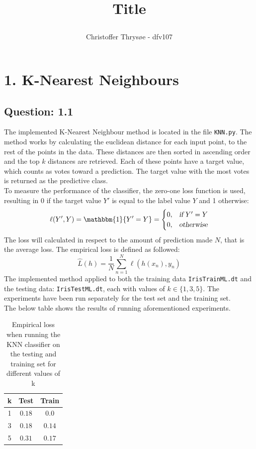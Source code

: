 \documentclass{article}
\title{
\vspace{1in}
\textmd{\textbf{Title}} \\
\author{Christoffer Thrysøe - dfv107}
}
\begin{document}
\maketitle
{}
\section{1. K-Nearest Neighbours}
\subsection{Question: 1.1}
The implemented K-Nearest Neighbour method is located in the file \texttt{KNN.py}. The method works by calculating the euclidean distance for each input point, to the rest of the points in the data. These distances are then sorted in ascending order and the top $k$ distances are retrieved. Each of these points have a target value, which counts as votes toward a prediction. The target value with the most votes is returned as the predictive class.
\\
To measure the performance of the classifier, the zero-one loss function is used, resulting in 0 if the target value $Y'$ is equal to the label value $Y$ and 1 otherwise:
\begin{equation*}
\begin{split}
\ell(Y',Y) =
\mathbbm{1} \lbrace Y'= Y \rbrace =
\begin{cases}
0,& \textsl{if } Y' = Y  \\
0,&  \textsl{otherwise}
\end{cases}
\end{split}
\label{indikator}
\end{equation*}
The loss will calculated in respect to the amount of prediction made $N$, that is the average loss. The empirical loss is defined as followed:
\begin{equation*}
\hat{L}(h) =  \dfrac{1}{N}\sum\limits^{N}_{n=1} \ell (h(x_n),y_n)
\end{equation*}
The implemented method applied to both the training data \texttt{IrisTrainML.dt} and the testing data: \texttt{IrisTestML.dt}, each with values of $k \in \lbrace 1,3,5 \rbrace$.
The experiments have been run separately for the test set and the training set.
\\
The below table shows the results of running aforementioned experiments.
\begin{table}[H]
  \centering
  \label{tab:table1}
  \begin{tabular}{c||c|c}
    \textsf{k} & \textsf{Test} & \textsf{Train} \\
    \hline
    1 & $0.18$ & $0.0$ \\
    3 & $0.18$ & $0.14$ \\    
    5 & $0.31$ & $0.17$\\
  \end{tabular}
  \caption{Empirical loss when running the KNN classifier on the testing and training set for different values of k} 
\end{table}
\end{document}
